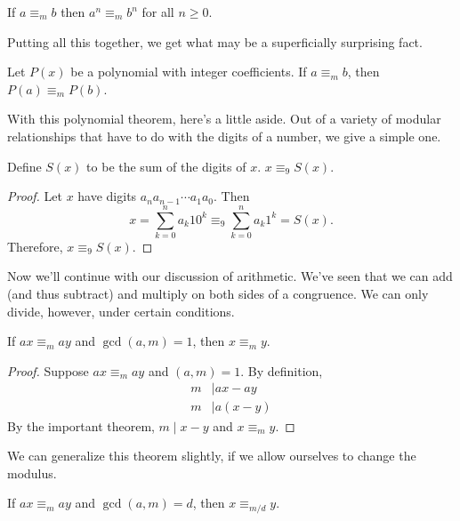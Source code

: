 \documentclass[../m55main.tex]{chapters}
\begin{document}

\begin{corollary}
    If $a \equiv_m b$ then $a^n \equiv_m b^n$ for all $n \geq 0$.
\end{corollary}

Putting all this together, we get what may be a superficially surprising fact.

\begin{corollary}
    Let $P(x)$ be a polynomial with integer coefficients.
    If $a \equiv_m b$, then $P(a) \equiv_m P(b)$.
\end{corollary}


With this polynomial theorem, here's a little aside.
Out of a variety of modular relationships that have to do with the digits of a number, we give a simple one.

\begin{theorem}
    Define $S(x)$ to be the sum of the digits of $x$.
    $x \equiv_9 S(x)$.
\end{theorem}

\begin{proof}
    Let $x$ have digits $a_n a_{n-1} \cdots a_1 a_0$.
    Then
    \[ x = \sum_{k=0}^n a_k 10^k \equiv_9 \sum_{k=0}^n a_k 1^k = S(x). \]
    Therefore, $x \equiv_9 S(x)$.
\end{proof}

Now we'll continue with our discussion of arithmetic.
We've seen that we can add (and thus subtract) and multiply on both sides of a congruence.
We can only divide, however, under certain conditions.

\begin{theorem}
    If $ax \equiv_m ay$ and $\gcd (a,m) = 1$, then $x \equiv_m y$.
\end{theorem}

\begin{proof}
    Suppose $ax \equiv_m ay$ and $(a,m) = 1$.
    By definition,
    \begin{align*}
        m &\mid ax - ay \\
        m &\mid a (x - y)
    \end{align*}
    By the important theorem, $m \mid x - y$ and $x \equiv_m y$.
\end{proof}

We can generalize this theorem slightly, if we allow ourselves to change the modulus.

\begin{theorem}
    If $ax \equiv_m ay$ and $\gcd (a,m) = d$, then $x \equiv_{m/d} y$.
\end{theorem}
\end{document}
